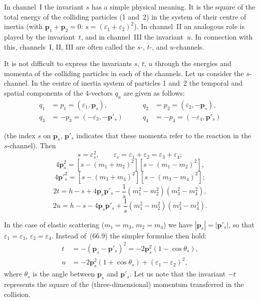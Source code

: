 In channel~I the invariant $s$ has a simple physical meaning. It is the square of the total energy of the colliding particles (1 and~2) in the system of their centre of inertia (with $\mathbf{p}_1 + \mathbf{p}_2 = 0$: $s = (\varepsilon_1 + \varepsilon_2)^2$). In channel~II an analogous role is played by the invariant~$t$, and in channel~III the invariant~$u$. In connection with this, channels~I, II, III are often called the $s$-, $t$-, and $u$-channels.

It is not difficult to express the invariants $s$, $t$, $u$ through the energies and momenta of the colliding particles in each of the channels. Let us consider the $s$-channel. In the centre of inertia system of particles 1 and~2 the temporal and spatial components of the 4-vectors $q_a$ are given as follows:
\begin{equation}
\begin{aligned}
q_1 &= p_1 = (\varepsilon_1, \mathbf{p}_s),\qquad &q_2 &= p_2 = (\varepsilon_2, -\mathbf{p}_s),\\[3pt]
q_3 &= -p_3 = (-\varepsilon_3, -\mathbf{p}'_s)\qquad &q_4 &= -p_4 = (-\varepsilon_4, \mathbf{p}'_s)
\end{aligned}
\tag{66.6}
\end{equation}

(the index $s$ on $\mathbf{p}_s$, $\mathbf{p}'_s$ indicates that these momenta refer to the reaction in the $s$-channel). Then
\begin{equation}
s = \varepsilon^2_s,\qquad \varepsilon_s = \varepsilon_1 + \varepsilon_2 = \varepsilon_3 + \varepsilon_4;
\tag{66.7}
\end{equation}
\begin{equation}
4\mathbf{p}^2_s = [s - (m_1 + m_2)^2][s - (m_1 - m_2)^2],
\tag{66.8}
\end{equation}
\begin{equation}
4\mathbf{p}'^2_s = [s - (m_3 + m_4)^2][s - (m_3 - m_4)^2];
\end{equation}
\begin{equation}
2t = h - s + 4\mathbf{p}_s\mathbf{p}'_s - \frac{1}{s}(m^2_1 - m^2_2)(m^2_3 - m^2_4),
\tag{66.9}
\end{equation}
\[
2u = h - s - 4\mathbf{p}_s\mathbf{p}'_s + \frac{1}{s}(m^2_1 - m^2_2)(m^2_3 - m^2_4).
\]

In the case of elastic scattering ($m_1 = m_3$, $m_2 = m_4$) we have $|\mathbf{p}_s| = |\mathbf{p}'_s|$, so that $\varepsilon_1 = \varepsilon_3$, $\varepsilon_2 = \varepsilon_4$. Instead of~(66.9) the simpler formulae then hold:
\begin{equation}
\begin{aligned}
t &= -(\mathbf{p}_s - \mathbf{p}'_s)^2 = -2\mathbf{p}^2_s(1 - \cos\theta_s),\\[3pt]
u &= -2\mathbf{p}^2_s(1 + \cos\theta_s) + (\varepsilon_1 - \varepsilon_2)^2,
\end{aligned}
\tag{66.10}
\end{equation}
where $\theta_s$ is the angle between $\mathbf{p}_s$ and $\mathbf{p}'_s$. Let us note that the invariant $-t$ represents the square of the (three-dimensional) momentum transferred in the collision.

